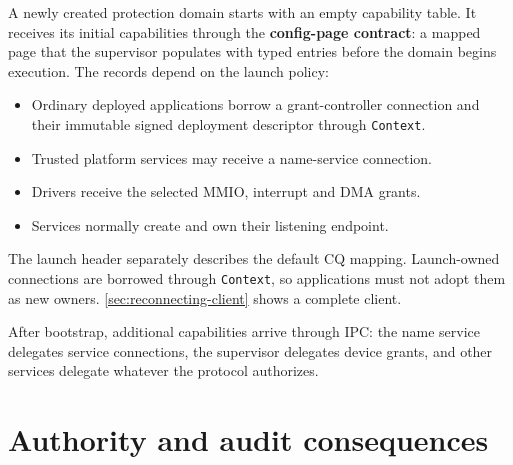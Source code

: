 A newly created protection domain starts with an empty capability table. It
receives its initial capabilities through the \textbf{config-page contract}: a
mapped page that the supervisor populates with typed entries before the domain
begins execution. The records depend on the launch policy:

\begin{itemize}
    \item Ordinary deployed applications borrow a grant-controller connection
        and their immutable signed deployment descriptor through \texttt{Context}.
    \item Trusted platform services may receive a name-service connection.
    \item Drivers receive the selected MMIO, interrupt and DMA grants.
    \item Services normally create and own their listening endpoint.
\end{itemize}

The launch header separately describes the default CQ mapping. Launch-owned
connections are borrowed through \texttt{Context}, so applications must not adopt
them as new owners. \autoref{sec:reconnecting-client} shows a complete client.

After bootstrap, additional capabilities arrive through IPC: the name service
delegates service connections, the supervisor delegates device grants, and other
services delegate whatever the protocol authorizes.

\section{Authority and audit consequences}

